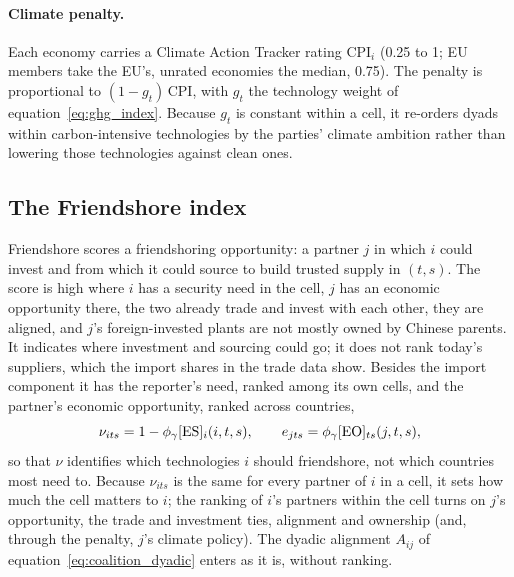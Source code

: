 \paragraph{Climate penalty.} Each economy carries a Climate Action Tracker rating $\mathrm{CPI}_i$
\citep{cat2026ratings} (0.25 to 1; EU members take the EU's, unrated economies the median, 0.75).
The penalty is proportional to $(1-g_t)\,\mathrm{CPI}$, with $g_t$ the technology weight of
equation~\eqref{eq:ghg_index}. Because $g_t$ is constant within a cell, it re-orders dyads within
carbon-intensive technologies by the parties' climate ambition \citep{clausing2023carbon} rather than
lowering those technologies against clean ones.

\subsection{The Friendshore index}\label{subsec:friendshore}

Friendshore scores a friendshoring opportunity: a partner $j$ in which $i$ could invest and from
which it could source to build trusted supply in $(t,s)$. The score is high where $i$ has a
security need in the cell, $j$ has an economic opportunity there, the two already trade and invest
with each other, they are aligned, and $j$'s foreign-invested plants are not mostly owned by Chinese
parents. It indicates where investment and sourcing could go; it does not rank today's suppliers,
which the import shares in the trade data show. Besides the import component it has the reporter's
need, ranked among its own cells, and the partner's economic opportunity, ranked across countries,
\begin{equation}\label{eq:fs_need}
  \nu_{its}=1-{\phi_{\gamma}}[\mathrm{ES}]_{i}(i,t,s),\qquad e_{jts}={\phi_{\gamma}}[\mathrm{EO}]_{ts}(j,t,s),
\end{equation}
so that $\nu$ identifies which technologies $i$ should friendshore, not which countries most need
to. Because $\nu_{its}$ is the same for every partner of $i$ in a cell, it sets how much the cell
matters to $i$; the ranking of $i$'s partners within the cell turns on $j$'s opportunity, the trade
and investment ties, alignment and ownership (and, through the penalty, $j$'s climate policy). The
dyadic alignment $A_{ij}$ of equation~\eqref{eq:coalition_dyadic} enters as it is, without
ranking.

